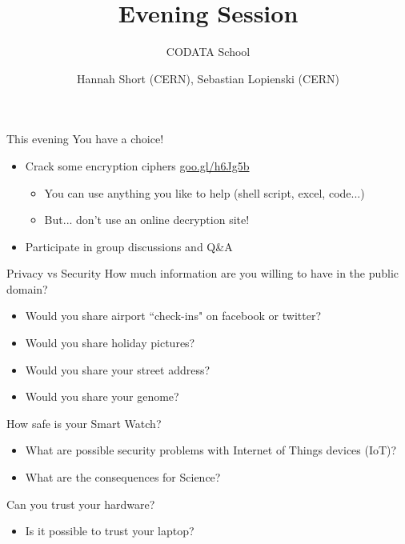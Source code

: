 \documentclass{beamer}
\author{Hannah Short (CERN), Sebastian Lopienski (CERN)}
\title{Evening Session}
\subtitle{CODATA School}
\begin{document}
\frontcover

\frame{\titlepage}


\begin{frame}{This evening}
You have a choice!
\begin{itemize}
\item Crack some encryption ciphers \url{goo.gl/h6Jg5b}
\begin{itemize}
\item You can use anything you like to help (shell script, excel, code...)
\item But... don't use an online decryption site!  
\end{itemize}
\item Participate in group discussions and Q\&A
\end{itemize}
\end{frame}

\begin{frame}{Privacy vs Security}
How much information are you willing to have in the public domain?
\begin{itemize}
\item Would you share airport ``check-ins" on facebook or twitter?
\item Would you share holiday pictures?
\item Would you share your street address?
\item Would you share your genome?
\end{itemize}
\end{frame}

\begin{frame}{How safe is your Smart Watch?}
\begin{itemize}
\item What are possible security problems with Internet of Things devices (IoT)?
\item What are the consequences for Science?
\end{itemize} 
\end{frame}

\begin{frame}{Can you trust your hardware?}
\begin{itemize}
\item Is it possible to trust your laptop?
\end{itemize}
\end{frame}
\end{document}
